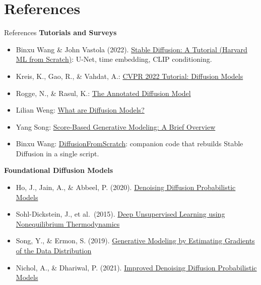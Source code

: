 \section{References}
\begin{frame}[allowframebreaks]{References}
\textbf{Tutorials and Surveys}
\begin{itemize}
    \item Binxu Wang \& John Vastola (2022). \href{https://binxuw.scholars.harvard.edu/sites/g/files/omnuum11221/files/binxuw/files/stable_diffusion_a_tutorial.pdf}{Stable Diffusion: A Tutorial (Harvard ML from Scratch)}: U-Net, time embedding, CLIP conditioning.
    \item Kreis, K., Gao, R., \& Vahdat, A.: \href{https://cvpr2022-tutorial-diffusion-models.github.io/}{CVPR 2022 Tutorial: Diffusion Models}
    \item Rogge, N., \& Rasul, K.: \href{https://huggingface.co/blog/annotated-diffusion}{The Annotated Diffusion Model}
    \item Lilian Weng: \href{https://lilianweng.github.io/posts/2021-07-11-diffusion-models/}{What are Diffusion Models?}
    \item Yang Song: \href{https://yang-song.net/blog/2021/score/}{Score-Based Generative Modeling: A Brief Overview}
    \item Binxu Wang: \href{https://github.com/Animadversio/DiffusionFromScratch}{DiffusionFromScratch}: companion code that rebuilds Stable Diffusion in a single script.
\end{itemize}

\framebreak

\textbf{Foundational Diffusion Models}
\begin{itemize}
    \item Ho, J., Jain, A., \& Abbeel, P. (2020). \href{https://arxiv.org/abs/2006.11239}{Denoising Diffusion Probabilistic Models}
    \item Sohl-Dickstein, J., et al.\ (2015). \href{https://arxiv.org/abs/1503.03585}{Deep Unsupervised Learning using Nonequilibrium Thermodynamics}
    \item Song, Y., \& Ermon, S. (2019). \href{https://arxiv.org/abs/1907.05600}{Generative Modeling by Estimating Gradients of the Data Distribution}
    \item Nichol, A., \& Dhariwal, P. (2021). \href{https://arxiv.org/abs/2102.09672}{Improved Denoising Diffusion Probabilistic Models}
\end{itemize}


\end{frame}
